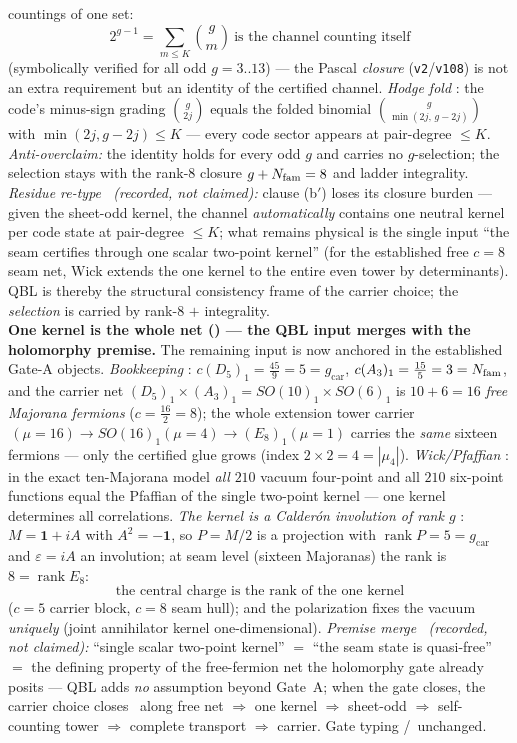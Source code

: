 \begin{keybox}
countings of one set:
\[
  \boxed{\ 2^{g-1}=\sum_{m\le K}\binom gm\ \text{is the channel counting itself}\ }
\]
(symbolically verified for all odd $g=3..13$) --- the Pascal \emph{closure} (\texttt{v2}/\texttt{v108}) is not an
extra requirement but an identity of the certified channel. \emph{Hodge fold} \mE: the code's
minus-sign grading $\binom g{2j}$ equals the folded binomial $\binom g{\min(2j,\,g-2j)}$ with
$\min(2j,g-2j)\le K$ --- every code sector appears at pair-degree $\le K$. \emph{Anti-overclaim:}
the identity holds for every odd $g$ and carries no $g$-selection; the selection stays with the
rank-$8$ closure $g+N_{\mathrm{fam}}=8$ and ladder integrality. \emph{Residue re-type \mC\ (recorded, not
claimed):} clause (b$'$) loses its closure burden --- given the sheet-odd kernel, the channel
\emph{automatically} contains one neutral kernel per code state at pair-degree $\le K$; what remains
physical is the single input ``the seam certifies through one scalar two-point kernel'' (for the
established free $c=8$ seam net, Wick extends the one kernel to the entire even tower by
determinants). QBL is thereby the structural consistency frame of the carrier choice; the
\emph{selection} is carried by rank-$8$ $+$ integrality.
\smallskip\\
\noindent\textbf{One kernel is the whole net () --- the QBL input
merges with the holomorphy premise.} The remaining input is now anchored in the established Gate-A
objects. \emph{Bookkeeping} \mE: $c(D_5)_1=\tfrac{45}9=5=g_{\mathrm{car}}$, $c(A_3)_1=\tfrac{15}5=3=N_{\mathrm{fam}}$,
and the carrier net $(D_5)_1\times(A_3)_1=SO(10)_1\times SO(6)_1$ is $10+6=16$ \emph{free Majorana
fermions} ($c=\tfrac{16}2=8$); the whole extension tower carrier$\,(\mu{=}16)\to SO(16)_1(\mu{=}4)\to
(E_8)_1(\mu{=}1)$ carries the \emph{same} sixteen fermions --- only the certified glue grows (index
$2\times2=4=|\mu_4|$). \emph{Wick/Pfaffian} \mE: in the exact ten-Majorana model \emph{all} $210$
vacuum four-point and all $210$ six-point functions equal the Pfaffian of the single two-point kernel
--- one kernel determines all correlations. \emph{The kernel is a Calder\'on involution of rank $g$}
\mE: $M=\mathbf1+iA$ with $A^2=-\mathbf1$, so $P=M/2$ is a projection with $\operatorname{rank}P=5=
g_{\mathrm{car}}$ and $\varepsilon=iA$ an involution; at seam level (sixteen Majoranas) the rank is
$8=\operatorname{rank}E_8$:
\[
  \boxed{\ \text{the central charge is the rank of the one kernel}\ }
\]
($c=5$ carrier block, $c=8$ seam hull); and the polarization fixes the vacuum \emph{uniquely} (joint
annihilator kernel one-dimensional). \emph{Premise merge \mC\ (recorded, not claimed):} ``single
scalar two-point kernel'' $=$ ``the seam state is quasi-free'' $=$ the defining property of the
free-fermion net the holomorphy gate already posits --- QBL adds \emph{no} assumption beyond Gate~A;
when the gate closes, the carrier choice closes \mE\ along free net $\Rightarrow$ one kernel
$\Rightarrow$ sheet-odd $\Rightarrow$ self-counting tower $\Rightarrow$ complete transport
$\Rightarrow$ carrier. Gate typing \mC/\mO\ unchanged.
\end{keybox}

